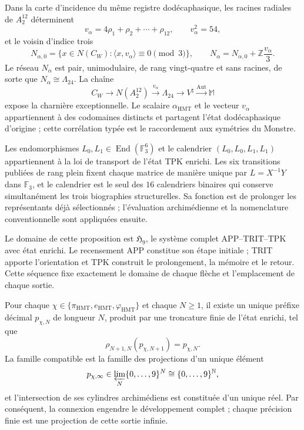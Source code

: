 \begin{theorem}
\label{thm:c27-alpha-rama-excepcional}
Dans la carte d'incidence du même registre dodécaphasique, les racines radiales
de \(A_2^{12}\) déterminent
\[
v_\alpha=4\rho_1+\rho_2+\cdots+\rho_{12},
\qquad v_\alpha^2=54,
\]
et le voisin d'indice trois
\[
N_{\alpha,0}
=\{x\in N(C_W):\langle x,v_\alpha\rangle\equiv0\pmod3\},
\qquad
N_\alpha=N_{\alpha,0}+\mathbb Z\frac{v_\alpha}{3}.
\]
Le réseau \(N_\alpha\) est pair, unimodulaire, de rang vingt-quatre et sans
racines, de sorte que \(N_\alpha\cong\Lambda_{24}\). La chaîne
\[
C_W\longrightarrow N(A_2^{12})
\xrightarrow{v_\alpha}\Lambda_{24}
\longrightarrow V^\natural
\xrightarrow{\operatorname{Aut}}\mathbb M
\]
expose la charnière exceptionnelle. Le scalaire \(\alpha_{\mathrm{HMT}}\) et le
vecteur \(v_\alpha\) appartiennent à des codomaines distincts et partagent l'état
dodécaphasique d'origine ; cette corrélation typée est le raccordement aux
symétries du Monstre.
\end{theorem}

\begin{proposition}
\label{prop:c27-estatuto-l0-l1}
Les endomorphismes \(L_0,L_1\in\operatorname{End}(\mathbb F_3^6)\) et le
calendrier \((L_0,L_0,L_1,L_1)\) appartiennent à la loi de transport de l'état
TPK enrichi. Les six transitions publiées de rang plein fixent
chaque matrice de manière unique par \(L=X^{-1}Y\) dans \(\mathbb F_3\), et le
calendrier est le seul des \(16\) calendriers binaires qui conserve
simultanément les trois biographies structurelles. Sa fonction est de prolonger
les représentants déjà sélectionnés ; l'évaluation archimédienne et la
nomenclature conventionnelle sont appliquées ensuite.
\end{proposition}

Le domaine de cette proposition est \(\mathfrak H_9\), le système complet
APP--TRIT--TPK avec état enrichi. Le recensement APP constitue son étape
initiale ; TRIT apporte l'orientation et TPK construit le prolongement, la
mémoire et le retour. Cette séquence fixe exactement le domaine de chaque
flèche et l'emplacement de chaque sortie.

\begin{theorem}
\label{thm:c27-profundidad-arbitraria}
Pour chaque
\(\chi\in\{\pi_{\mathrm{HMT}},e_{\mathrm{HMT}},
\varphi_{\mathrm{HMT}}\}\) et chaque \(N\ge1\), il existe un unique préfixe
décimal \(p_{\chi,N}\) de longueur \(N\), produit par une troncature
finie de l'état enrichi, tel que
\[
 \rho_{N+1,N}(p_{\chi,N+1})=p_{\chi,N}.
\]
La famille compatible est la famille des projections d'un unique élément
\[
 p_{\chi,\infty}
 \in\varprojlim_N\{0,\ldots,9\}^{N}
 \cong\{0,\ldots,9\}^{\mathbb N},
\]
et l'intersection de ses cylindres archimédiens est constituée d'un unique réel.
Par conséquent, la connexion engendre le développement complet ; chaque précision
finie est une projection de cette sortie infinie.
\end{theorem}

